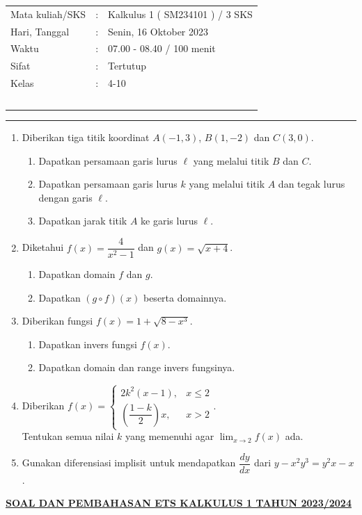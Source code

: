 \documentclass[10pt,openany,a4paper]{article}
\theoremstyle{definition}
\theoremstyle{definition}
\theoremstyle{plain}
\begin{document}
    \begin{center}
	\begin{tabular}{lcl}
		Mata kuliah/SKS & : & Kalkulus 1 ( SM234101 ) / 3 SKS\\
		Hari, Tanggal & : & Senin, 16 Oktober 2023\\
		Waktu & : & 07.00 - 08.40 / 100 menit\\
		Sifat & : & Tertutup\\
		Kelas & : & 4-10\\
  ~
	\end{tabular}

    \noindent\rule{\textwidth}{2.pt}
        \end{center}
    \begin{enumerate}
    \item Diberikan tiga titik koordinat $A(-1,3)$, $B(1,-2)$ dan $C(3,0)$.
    \begin{enumerate}
        \item Dapatkan persamaan garis lurus $\ell$ yang melalui titik $B$ dan $C$.
        \item Dapatkan persamaan garis lurus $k$ yang melalui titik $A$ dan tegak lurus dengan garis $\ell$.
        \item Dapatkan jarak titik $A$ ke garis lurus $\ell$.
    \end{enumerate}

    \item Diketahui $f(x)=\dfrac{4}{x^2-1}$ dan $g(x)=\sqrt{x+4}$.
    \begin{enumerate}
        \item Dapatkan domain $f$ dan $g$.
        \item Dapatkan $(g\circ f)(x)$ beserta domainnya.
    \end{enumerate}

    \item Diberikan fungsi $f(x)=1+\sqrt{8-x^3}$.
    \begin{enumerate}
        \item Dapatkan invers fungsi $f(x)$.
        \item Dapatkan domain dan range invers fungsinya.
    \end{enumerate}

    \item Diberikan $f(x)=\begin{cases}
        2k^2(x-1), & x\leq 2\\
        \left(\dfrac{1-k}{2}\right)x, & x>2
    \end{cases}$.\\
    Tentukan semua nilai $k$ yang memenuhi agar $\displaystyle\lim_{x\to 2}f(x)$ ada.

    \item Gunakan diferensiasi implisit untuk mendapatkan $\dfrac{dy}{dx}$ dari $y-x^2y^3=y^2x-x$.
\end{enumerate}
\newpage
 \begin{center}
	{\underline{\textbf{\MakeUppercase{Soal dan Pembahasan ETS Kalkulus 1 Tahun 2023/2024}}}}
    \end{center}
\end{document}

